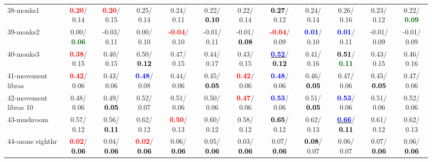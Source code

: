 \begin{table}[h]
\begin{center}
{\begin{tabular}{lc|c|c|c|c|c|c|c|c|c|c}
38-monks1 & \textcolor{red}{\textbf{  0.20}}/  0.14 & \textcolor{red}{\textbf{  0.20}}/  0.15 &   0.25/  0.14 &   0.24/  0.11 &   0.22/\textcolor{black}{\textbf{  0.10}} &   0.22/  0.14 & \textcolor{black}{\textbf{  0.27}}/  0.12 &   0.24/  0.14 &   0.26/  0.16 &   0.23/  0.12 &   0.22/\textcolor{darkgreen}{\textbf{  0.09}} \\
39-monks2 &   0.00/\textcolor{darkgreen}{\textbf{  0.06}} &  -0.03/  0.11 &   0.00/  0.10 & \textcolor{red}{\textbf{ -0.04}}/  0.10 &  -0.01/  0.11 &  -0.01/\textcolor{black}{\textbf{  0.08}} & \textcolor{red}{\textbf{ -0.04}}/  0.09 & \textcolor{blue}{\textbf{  0.01}}/  0.10 & \textcolor{blue}{\textbf{  0.01}}/  0.11 &  -0.01/  0.09 &  -0.01/  0.09 \\ \hline
40-monks3 & \textcolor{red}{\textbf{  0.38}}/  0.15 &   0.40/  0.15 &   0.50/\textcolor{black}{\textbf{  0.12}} &   0.47/  0.15 &   0.44/  0.17 &   0.43/  0.15 & \underline{\textcolor{blue}{\textbf{  0.52}}}/\textcolor{black}{\textbf{  0.12}} &   0.41/  0.16 & \textcolor{black}{\textbf{  0.51}}/\textcolor{darkgreen}{\textbf{  0.11}} &   0.43/  0.15 &   0.46/  0.16 \\
41-movement libras & \textcolor{red}{\textbf{  0.42}}/  0.06 &   0.43/  0.06 & \textcolor{blue}{\textbf{  0.48}}/  0.08 &   0.44/  0.06 &   0.45/\textcolor{black}{\textbf{  0.05}} & \textcolor{red}{\textbf{  0.42}}/  0.06 & \textcolor{blue}{\textbf{  0.48}}/  0.06 &   0.46/\textcolor{black}{\textbf{  0.05}} &   0.47/  0.06 &   0.45/\textcolor{black}{\textbf{  0.05}} &   0.47/  0.06 \\
42-movement libras 10 &   0.48/  0.06 &   0.49/\textcolor{black}{\textbf{  0.05}} &   0.52/  0.07 &   0.51/  0.06 &   0.50/  0.06 & \textcolor{red}{\textbf{  0.47}}/  0.06 & \textcolor{blue}{\textbf{  0.53}}/  0.06 &   0.51/\textcolor{black}{\textbf{  0.05}} & \textcolor{blue}{\textbf{  0.53}}/  0.06 &   0.51/  0.06 &   0.52/  0.06 \\
43-mushroom &   0.57/  0.12 &   0.56/\textcolor{black}{\textbf{  0.11}} &   0.62/  0.12 & \textcolor{red}{\textbf{  0.50}}/  0.13 &   0.60/  0.12 &   0.58/  0.12 & \textcolor{black}{\textbf{  0.65}}/  0.12 &   0.62/  0.13 & \underline{\textcolor{blue}{\textbf{  0.66}}}/\textcolor{black}{\textbf{  0.11}} &   0.61/  0.12 &   0.62/  0.13 \\
44-ozone eighthr & \textcolor{red}{\textbf{  0.02}}/\textcolor{black}{\textbf{  0.06}} &   0.04/\textcolor{black}{\textbf{  0.06}} & \textcolor{red}{\textbf{  0.02}}/\textcolor{black}{\textbf{  0.06}} &   0.06/\textcolor{black}{\textbf{  0.06}} &   0.05/\textcolor{black}{\textbf{  0.06}} &   0.03/\textcolor{black}{\textbf{  0.06}} &   0.07/\textcolor{black}{\textbf{  0.06}} & \textcolor{black}{\textbf{  0.08}}/  0.07 &   0.06/  0.07 &   0.07/\textcolor{black}{\textbf{  0.06}} &   0.06/\textcolor{black}{\textbf{  0.06}} \\

\end{tabular}}
\end{center}
\end{table}
